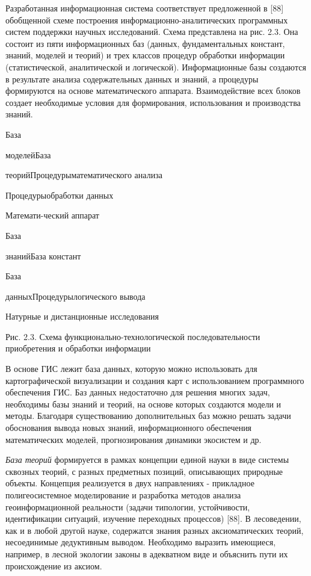 \documentclass{article}
\begin{document}
Разработанная информационная система соответствует 
предложенной в [88] обобщенной схеме построения 
информационно-аналитических программных систем 
поддержки научных исследований. Схема представлена 
на рис. 2.3. Она состоит из пяти информационных 
баз (данных, фундаментальных констант, знаний, 
моделей и теорий) и трех классов процедур обработки 
информации (статистической, аналитической 
и логической). Информационные базы создаются 
в результате анализа содержательных данных 
и знаний, а процедуры формируются на основе 
математического аппарата. Взаимодействие всех 
блоков создает необходимые условия для формирования, 
использования и производства знаний.

\begin{center}
База 

моделейБаза 

теорийПроцедурыматематического анализа

Процедурыобработки данных

Математи-ческий аппарат

База 

знанийБаза констант

База 

данныхПроцедурылогического вывода

Натурные и дистанционные исследования 

Рис. 2.3. Схема функционально-технологической 
последовательности приобретения и обработки 
информации
\end{center}

В основе ГИС лежит база данных, которую можно 
использовать для картографической визуализации 
и создания карт с использованием программного 
обеспечения ГИС. Баз данных недостаточно для 
решения многих задач, необходимы базы знаний 
и теорий, на основе которых создаются модели 
и методы. Благодаря существованию дополнительных 
баз можно решать задачи обоснования вывода 
новых знаний, информационного обеспечения 
математических моделей, прогнозирования динамики 
экосистем и др. 

\textit{База теорий} формируется в рамках концепции 
единой науки в виде системы сквозных теорий, 
с разных предметных позиций, описывающих природные 
объекты. Концепция реализуется в двух направлениях 
- прикладное полигеосистемное моделирование 
и разработка методов анализа геоинформационной 
реальности (задачи типологии, устойчивости, 
идентификации ситуаций, изучение переходных 
процессов) [88]. В лесоведении, как и в любой другой 
науке, содержатся знания разных аксиоматических 
теорий, несоединимые дедуктивным выводом. Необходимо 
выразить имеющиеся, например, в лесной экологии 
законы в адекватном виде и объяснить пути их 
происхождение из аксиом.
\end{document}
